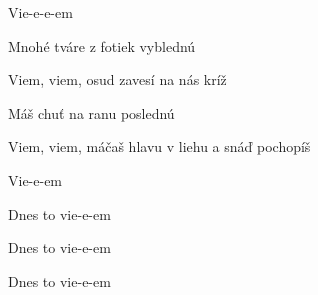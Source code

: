 \begin{song}
\bigskip

Vie-e-e-em \par

\bigskip

 Mnohé tváre z fotiek vyblednú \par
Viem, viem, osud zavesí na nás kríž  \par
{} Máš chuť na ranu poslednú \par
Viem, viem, máčaš hlavu v liehu a snáď pochopíš \par

\bigskip

\PredrefrenARefren

\bigskip

Vie-e-em \par
Dnes to vie-e-em \par
Dnes to vie-e-em \par
Dnes to vie-e-em \par

\end{song}
